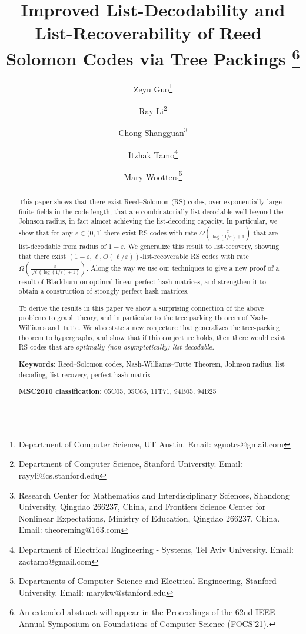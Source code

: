 \documentclass[11pt]{article}
\newcommand\black[1]{{\color{black} #1}}
\renewcommand{\epsilon}{\varepsilon}
\begin{document}
\title{Improved List-Decodability and List-Recoverability of Reed--Solomon Codes via Tree Packings
\footnote{An extended abstract will appear in the Proceedings of the 62nd IEEE Annual Symposium on Foundations of Computer
Science (FOCS'21).}}

\author{Zeyu Guo\footnote{Department of Computer Science, UT Austin. Email: zguotcs@gmail.com}
\and
Ray Li\footnote{Department of Computer Science, Stanford University. Email: rayyli@cs.stanford.edu}
\and
Chong Shangguan\footnote{Research Center for Mathematics and Interdisciplinary Sciences, Shandong University, Qingdao 266237, China, and Frontiers Science Center for Nonlinear Expectations, Ministry of Education, Qingdao 266237, China. Email: theoreming@163.com}
\and
Itzhak Tamo\footnote{Department of Electrical Engineering - Systems, Tel Aviv University. Email: zactamo@gmail.com}
\and
Mary Wootters\footnote{Departments of Computer Science and Electrical Engineering, Stanford University.  Email: marykw@stanford.edu}
}
\date{}
\maketitle
\thispagestyle{empty}
\begin{abstract}
    This paper shows that there exist Reed--Solomon (RS) codes, over \black{exponentially} large finite fields \black{in the code length}, that are combinatorially list-decodable well beyond the Johnson radius, in fact almost achieving the list-decoding capacity.
    In particular, we show that for any $\epsilon\in (0,1]$ there exist RS codes with rate $\Omega(\frac{\epsilon}{\log(1/\epsilon)+1})$ that are list-decodable from radius of $1-\epsilon$. We generalize this result to list-recovery, showing that there exist $(1 - \epsilon, \ell, O(\ell/\epsilon))$-list-recoverable RS codes with rate $\Omega\left( \frac{\epsilon}{\sqrt{\ell} (\log(1/\epsilon)+1)} \right)$. Along the way we use our techniques to  give a new proof  of a  result of Blackburn on optimal linear perfect hash matrices, and strengthen it to obtain a construction of strongly perfect hash matrices.

    To derive the results in this paper we show a surprising connection of the above problems to graph theory, and in particular to the  tree packing theorem of Nash-Williams and Tutte. We also state a new conjecture that generalizes the tree-packing theorem to hypergraphs, and show that if this conjecture holds, then there would exist RS codes that are \em optimally \em (non-asymptotically) list-decodable.


\par\textbf{Keywords:} Reed--Solomon codes, Nash-Williams--Tutte Theorem, Johnson radius, list decoding, list recovery, perfect hash matrix

\par\textbf{MSC2010 classification:} 05C05, 05C65, 11T71, 94B05, 94B25

\end{abstract}
\end{document}
